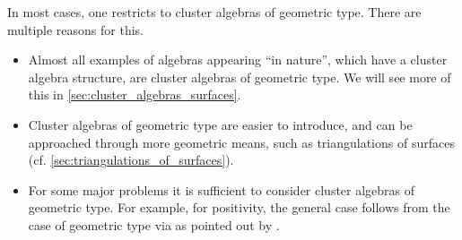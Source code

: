 \medskip

In most cases, one restricts to cluster algebras of geometric type. There are multiple
reasons for this.
\begin{itemize}
	\item Almost all examples of algebras appearing ``in nature'', which have a cluster algebra
	      structure, are cluster algebras of geometric type. We will see more of this in
	      \cref{sec:cluster_algebras_surfaces}.
	\item Cluster algebras of geometric type are easier to introduce, and can be approached
	      through more geometric means, such as triangulations of surfaces (cf.
	      \cref{sec:triangulations_of_surfaces}).
	\item For some major problems it is sufficient to consider cluster algebras of geometric type. For
	      example, for positivity, the general case follows from the case of geometric type via
	      \cite[Theorem 3.7]{FominZelevinsky2007CA4Coefficients} as pointed out by
	      \textcite[Proof of Theorem 4.2]{LeeSchiffler2015PositivityCA}.
\end{itemize}

